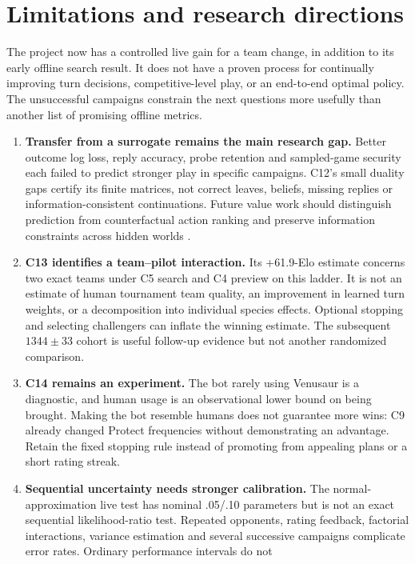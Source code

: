 \section{Limitations and research directions}
\label{sec:limits}

The project now has a controlled live gain for a team change, in addition to
its early offline search result. It does not have a proven process for
continually improving turn decisions, competitive-level play, or an
end-to-end optimal policy. The unsuccessful campaigns constrain the next
questions more usefully than another list of promising offline metrics.

\begin{enumerate}
 \item \textbf{Transfer from a surrogate remains the main research gap.}
 Better outcome log loss, reply accuracy, probe retention and sampled-game
 security each failed to predict stronger play in specific campaigns. C12's
 small duality gaps certify its finite matrices, not correct leaves, beliefs,
 missing replies or information-consistent continuations. Future value work
 should distinguish prediction from counterfactual action ranking and preserve
 information constraints across hidden worlds \citep{brown2018depth}.
 \item \textbf{C13 identifies a team--pilot interaction.}
 Its +61.9-Elo estimate concerns two exact teams under C5 search and C4
 preview on this ladder. It is not an estimate of human tournament team
 quality, an improvement in learned turn weights, or a decomposition into
 individual species effects. Optional stopping and selecting challengers can
 inflate the winning estimate. The subsequent $1344\pm33$ cohort is useful
 follow-up evidence but not another randomized comparison.
 \item \textbf{C14 remains an experiment.}
 The bot rarely using Venusaur is a diagnostic, and human usage is an
 observational lower bound on being brought. Making the bot resemble humans
 does not guarantee more wins: C9 already changed Protect frequencies without
 demonstrating an advantage. Retain the fixed stopping rule instead of
 promoting from appealing plans or a short rating streak.
 \item \textbf{Sequential uncertainty needs stronger calibration.}
 The normal-approximation live test has nominal .05/.10 parameters but is
 not an exact sequential likelihood-ratio test. Repeated opponents, rating
 feedback, factorial interactions, variance estimation and several successive
 campaigns complicate error rates. Ordinary performance intervals do not

\end{enumerate}
